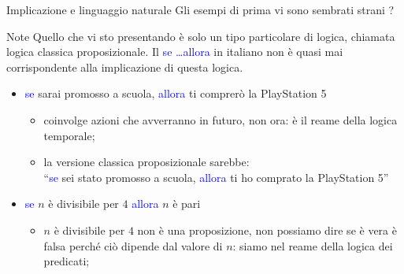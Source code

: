 \documentclass[aspectratio=169,10pt]{beamer}
\newcommand{\conn}[1]{\textcolor{blue}{#1}}
\begin{document}
\begin{frame}[fragile]{Implicazione e linguaggio naturale}
    Gli esempi di prima vi sono sembrati strani ?
    \begin{block}{Note}
        Quello che vi sto presentando è solo un tipo particolare di logica, chiamata \alert{logica classica proposizionale}. Il \conn{se \ldots allora} in italiano non è quasi mai corrispondente alla implicazione di questa logica.
    \end{block}
    \begin{example}
        \begin{itemize}
        \item \conn{se} sarai promosso a scuola, \conn{allora} ti comprerò la PlayStation 5
        \begin{itemize}
            \item coinvolge azioni che avverranno in futuro, non ora: è il reame della \alert{logica temporale};
            \item la versione classica proposizionale  sarebbe:\\
            ``\conn{se} sei stato promosso a scuola, \conn{allora} ti ho comprato la PlayStation 5''  
        \end{itemize}
        \pause
        \item \conn{se} $n$ è divisibile per $4$ \conn{allora} $n$ è pari
        \begin{itemize}
            \item $n$ è divisibile per $4$ non è una proposizione, non possiamo dire se è vera è falsa perché ciò dipende dal valore di $n$: siamo nel reame della \alert{logica dei predicati};

\end{itemize}
\end{itemize}
\end{example}
\end{frame}
\end{document}
